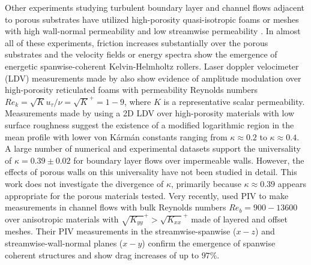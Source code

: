 \documentclass[letterpaper,11pt]{article}
\newcommand{\kpxx}{\sqrt{K_{xx}}^+}
\newcommand{\kpyy}{\sqrt{K_{yy}}^+}
\begin{document}
Other experiments studying turbulent boundary layer and channel flows adjacent to porous substrates have utilized high-porosity quasi-isotropic foams \citep{manes2011turbulent, efstathiou2018mean} or meshes with high wall-normal permeability and low streamwise permeability \citep{suga2018anisotropic}. In almost all of these experiments, friction increases substantially over the porous substrates and the velocity fields or energy spectra show the emergence of energetic spanwise-coherent Kelvin-Helmholtz rollers. Laser doppler velocimeter (LDV) measurements made by \citet{efstathiou2018mean} also show evidence of amplitude modulation over high-porosity reticulated foams with permeability Reynolds numbers $Re_k = \sqrt{K} u_\tau/ \nu = \sqrt{K}^+ = 1-9$, where $K$ is a representative scalar permeability.  Measurements made by \citet{manes2011turbulent} using a 2D LDV over high-porosity materials with low surface roughness suggest the existence of a modified logarithmic region in the mean profile with lower von K\'arm\'an constants ranging from $\kappa \approx 0.2$ to $\kappa \approx 0.4$.  A large number of numerical and experimental datasets support the universality of $\kappa = 0.39 \pm 0.02$ \citep{marusic2013logarithmic} for boundary layer flows over impermeable walls.  However, the effects of porous walls on this universality have not been studied in detail. This work does not investigate the divergence of $\kappa$, primarily because $\kappa \approx 0.39$ appears appropriate for the porous materials tested. Very recently, \citet{suga2018anisotropic} used PIV to make measurements in channel flows with bulk Reynolds numbers $Re_b = 900-13600$ over anisotropic materials with $\kpyy > \kpxx$ made of layered and offset meshes. Their PIV measurements in the streamwise-spanwise ($x-z$) and streamwise-wall-normal planes ($x-y$) confirm the emergence of spanwise coherent structures and show drag increases of up to $97\%$. 
\end{document}
